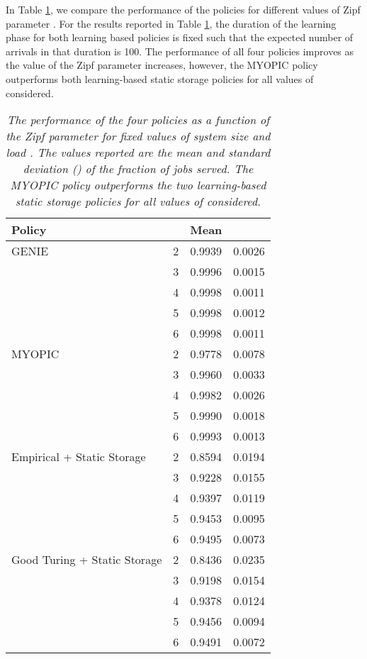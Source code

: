\documentclass[10pt, conference, letterpaper]{IEEEtran}
\begin{document}
In Table \ref{table:diff_beta}, we compare the performance of the policies for different values of Zipf parameter . For the results reported in Table \ref{table:diff_beta}, the duration of the learning phase for both learning based policies is fixed such that the expected number of arrivals in that duration is 100. The performance of all four policies improves as the value of the Zipf parameter  increases, however, the MYOPIC policy outperforms both learning-based static storage policies for all values of  considered.


\begin{table}[h]
	\centering
	\begin{tabular}{l c c c }
		\hline\hline
		Policy &  & Mean &  \\ [0.5ex] \hline GENIE & 2 & 0.9939 & 0.0026 \\
		& 3 & 0.9996 & 0.0015 \\
		& 4 & 0.9998 & 0.0011 \\
		& 5 & 0.9998 & 0.0012 \\
		& 6 & 0.9998 & 0.0011 \\
		\hline
		MYOPIC & 2 & 0.9778 & 0.0078 \\
		& 3 & 0.9960 & 0.0033 \\
		& 4 & 0.9982 & 0.0026 \\
		& 5 & 0.9990 & 0.0018 \\
		& 6 & 0.9993 & 0.0013 \\
		\hline
		Empirical + Static Storage & 2 & 0.8594 & 0.0194  \\
		& 3 & 0.9228 & 0.0155 \\
		& 4 & 0.9397 & 0.0119 \\
		& 5 & 0.9453 & 0.0095 \\
		& 6 & 0.9495 & 0.0073 \\
		\hline
		Good Turing + Static Storage & 2 & 0.8436 & 0.0235  \\
		& 3 & 0.9198 & 0.0154 \\
		& 4 & 0.9378 & 0.0124 \\
		& 5 & 0.9456 & 0.0094 \\
		& 6 & 0.9491 & 0.0072 \\
		\hline
	\end{tabular}
	\caption{\sl The performance of the four policies as a function of the Zipf parameter  for fixed values of system size  and load . The values reported are the mean and standard deviation () of the fraction of jobs served. The MYOPIC policy outperforms the two learning-based static storage policies for all values of  considered.}
	
	\label{table:diff_beta} \end{table}
\end{document}
